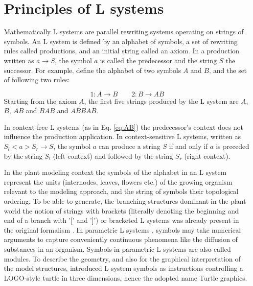 \section{Principles of L systems}

Mathematically L  systems are parallel rewriting  systems operating on
strings of symbols. An L system  is defined by an alphabet of symbols,
a set  of rewriting  rules called productions,  and an  initial string
called an  axiom. In  a production written  as $a \rightarrow  S$, the
symbol $a$ is called the predecessor and the string $S$ the successor.
For example, define  the alphabet of two symbols $A$  and $B$, and the
set of following two rules:

\begin{equation}\label{eq:AB}
1: A \rightarrow B \qquad 2: B \rightarrow AB 
\end{equation}
Starting from the axiom $A$, the  first five strings produced by the L
system are $A$, $B$, $AB$ and $BAB$ and $ABBAB$.

In context-free  L systems (as in Eq.   \ref{eq:AB}) the predecessor's
context   does   not  influence   the   production  application.    In
context-sensitive L systems, written as $S_l < a > S_r \rightarrow S$,
the symbol $a$ can produce a string $S$ if and only if $a$ is preceded
by the  string $S_l$ (left context)  and followed by  the string $S_r$
(right context).

In the  plant modeling  context the  symbols of the  alphabet in  an L
system represent the units  (internodes, leaves, flowers etc.)  of the
growing organism relevant to the  modeling approach, and the string of
symbols  their topological  ordering.   To be  able  to generate,  the
branching structures dominant in the plant world the notion of strings
with brackets  (literally denoting the  beginning and end of  a branch
with '['  and ']') or bracketed  L systems was already  present in the
original  formalism \citep{lindenmayer:68}.   In parametric  L systems
\citep{pp:90a},  symbols  may  take  numerical  arguments  to  capture
conveniently continuous phenomena like  the diffusion of substances in
an organism.  Symbols in parametric L systems are also called modules.
To describe the geometry, and also for the graphical interpretation of
the  model structures,  \citet{pp:86} introduced  L system  symbols as
instructions  controlling a  LOGO-style  turtle \citep{abelson:82}  in
three dimensions, hence the adopted name Turtle graphics.

